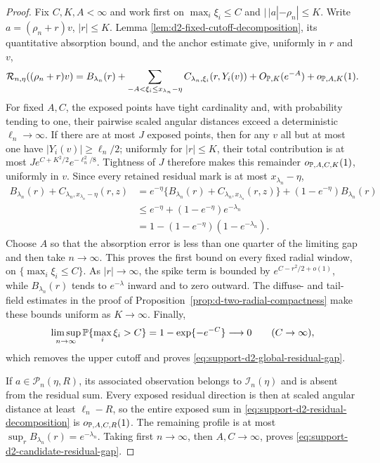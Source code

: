 \begin{proof}
Fix \(C,K,A<\infty\) and work first on
\(\max_i\xi_i\le C\) and \(|\,|a|-\rho_n|\le K\).  Write
\(a=(\rho_n+r)v\), \(|r|\le K\).  Lemma
\ref{lem:d2-fixed-cutoff-decomposition}, its quantitative absorption bound,
and the anchor estimate give, uniformly in \(r\) and \(v\),
\begin{equation}
\label{eq:support-d2-residual-decomposition}
 \mathcal R_{n,\eta}((\rho_n+r)v)
 =B_{\lambda_n}(r)
  +\sum_{\substack{-A<\xi_i\le x_{\lambda_n}-\eta}}
    C_{\lambda_n,\xi_i}(r,Y_i(v))
  +O_{\mathbb P,K}(e^{-A})+o_{\mathbb P,A,K}(1).
\end{equation}
For fixed \(A,C\), the exposed points have tight cardinality and, with
probability tending to one, their pairwise scaled angular distances exceed a
deterministic \(\ell_n\to\infty\).  If there are at most \(J\) exposed points,
then for any \(v\) all but at most one have \(|Y_i(v)|\ge\ell_n/2\); uniformly
for \(|r|\le K\), their total contribution is at most
\(J e^{C+K^2/2}e^{-\ell_n^2/8}\).  Tightness of \(J\) therefore makes this
remainder \(o_{\mathbb P,A,C,K}(1)\), uniformly in \(v\).  Since every retained
residual mark is at most
\(x_{\lambda_n}-\eta\),
\begin{align*}
 B_{\lambda_n}(r)
 +C_{\lambda_n,x_{\lambda_n}-\eta}(r,z)
 &=e^{-\eta}
   \{B_{\lambda_n}(r)+C_{\lambda_n,x_{\lambda_n}}(r,z)\}
   +(1-e^{-\eta})B_{\lambda_n}(r)\\
 &\le e^{-\eta}+(1-e^{-\eta})e^{-\lambda_n}\\
 &=1-(1-e^{-\eta})(1-e^{-\lambda_n}).
\end{align*}
Choose \(A\) so that the absorption error is less than one quarter of the
limiting gap and then take \(n\to\infty\).  This proves the first bound on
every fixed radial window, on \(\{\max_i\xi_i\le C\}\).  As \(|r|\to\infty\),
the spike term is bounded by \(e^{C-r^2/2+o(1)}\), while
\(B_{\lambda_n}(r)\) tends to \(e^{-\lambda}\) inward and to zero outward.
The diffuse- and tail-field estimates in the proof of
Proposition~\ref{prop:d-two-radial-compactness} make these bounds uniform as
\(K\to\infty\).  Finally,
\[
 \limsup_{n\to\infty}\mathbb P\{\max_i\xi_i>C\}
 =1-\exp\{-e^{-C}\}\longrightarrow0
 \qquad(C\to\infty),
\]
which removes the upper cutoff and proves
\eqref{eq:support-d2-global-residual-gap}.

If \(a\in\mathcal P_n(\eta,R)\), its associated observation belongs to
\(\mathcal I_n(\eta)\) and is absent from the residual sum.  Every exposed
residual direction is then at scaled angular distance at least
\(\ell_n-R\), so the entire exposed sum in
\eqref{eq:support-d2-residual-decomposition} is \(o_{\mathbb P,A,C,R}(1)\).
The remaining profile is at most
\(\sup_rB_{\lambda_n}(r)=e^{-\lambda_n}\).  Taking first \(n\to\infty\),
then \(A,C\to\infty\), proves
\eqref{eq:support-d2-candidate-residual-gap}.
\end{proof}


